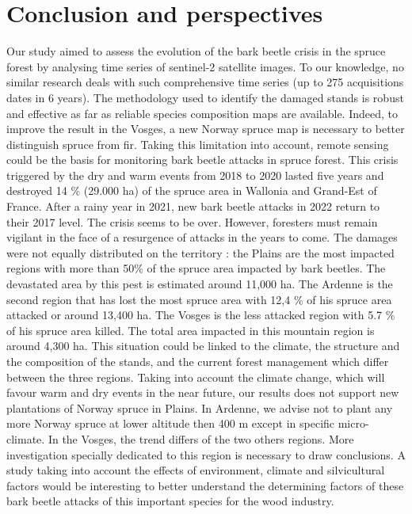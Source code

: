 \documentclass[3p,procedia]{elsarticle}
\begin{document}
\section{Conclusion and perspectives}
Our study aimed to assess the evolution of the bark beetle crisis in the spruce forest by analysing time series of sentinel-2 satellite images.
To our knowledge, no similar research deals with such comprehensive time series (up to 275 acquisitions dates in 6 years).
The methodology used to identify the damaged stands is robust and effective as far as reliable species composition maps are available.
Indeed, to improve the result in the Vosges, a new Norway spruce map is necessary to better distinguish spruce from fir.
Taking this limitation into account, remote sensing could be the basis for monitoring bark beetle attacks in spruce forest.
This crisis triggered by the dry and warm events from 2018 to 2020 lasted five years and destroyed 14 \% (29.000 ha) of the spruce area in Wallonia and Grand-Est of France.
After a rainy year in 2021, new bark beetle attacks in 2022 return to their 2017 level. The crisis seems to be over. However, foresters must remain vigilant in the face of a resurgence of attacks in the years to come.   
The damages were not equally distributed on the territory : the Plains are the most impacted regions with more than 50\% of the spruce area impacted by bark beetles.
The devastated area by this pest is estimated around 11,000 ha.
The Ardenne is the second region that has lost the most spruce area with  12,4 \% of his spruce area attacked or around 13,400 ha. 
The Vosges is the less attacked region with 5.7 \% of his spruce area killed. The total area impacted in this mountain region is around 4,300 ha.
This situation could be linked to the climate, the structure and the composition of the stands, and the current forest management which differ between the three regions.
Taking into account the climate change, which will favour warm and dry events in the near future, our results does not support new plantations of Norway spruce in Plains.
In Ardenne, we advise not to plant any more Norway spruce at lower altitude then 400 m except in specific micro-climate.
In the Vosges, the trend differs of the two others regions.
More investigation specially dedicated to this region is necessary to draw conclusions.
A study taking into account the effects of environment, climate and silvicultural factors would be interesting to better understand the determining factors of these bark beetle attacks of this important species for the wood industry.
\end{document}
